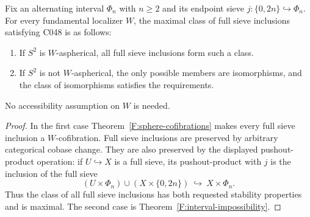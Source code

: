\begin{corollary}\label{F:C048-dichotomy}
Fix an alternating interval $\Phi_n$ with $n\geq2$ and its endpoint
sieve $j:\{0,2n\}\hookrightarrow\Phi_n$. For every fundamental
localizer $W$, the maximal class of full sieve inclusions satisfying
C048 is as follows:
\begin{enumerate}
\item If $S^2$ is $W$-aspherical, all full sieve inclusions form such a
class.
\item If $S^2$ is not $W$-aspherical, the only possible members are
isomorphisms, and the class of isomorphisms satisfies the requirements.
\end{enumerate}
No accessibility assumption on $W$ is needed.
\end{corollary}
\begin{proof}
In the first case Theorem~\ref{F:sphere-cofibrations} makes every
full sieve inclusion a $W$-cofibration. Full sieve inclusions are
preserved by arbitrary categorical cobase change. They are also
preserved by the displayed pushout-product operation: if
$U\hookrightarrow X$ is a full sieve, its pushout-product with $j$
is the inclusion of the full sieve
\[
 (U\times\Phi_n)\cup(X\times\{0,2n\})
 \ \hookrightarrow\ X\times\Phi_n.
\]
Thus the class of all full sieve inclusions has both requested
stability properties and is maximal.
The second case is Theorem~\ref{F:interval-impossibility}.
\end{proof}
